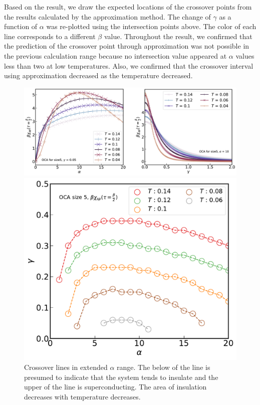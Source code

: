 \documentclass{article}[12pt]
\begin{document}
\begin{spacing}{1.3}
Based on the result, we draw the expected locations of the crossover points from the results calculated by the approximation method. 
The change of $\gamma$ as a function of $\alpha$ was re-plotted using the intersection points above. 
The color of each line corresponds to a different $\beta$ value.
Throughout the result, we confirmed that the prediction of the crossover point through approximation was not possible 
in the previous calculation range because no intersection value appeared at $\alpha$ values less than two at low temperatures. 
Also, we confirmed that the crossover interval using approximation decreased as the temperature decreased.
\pagebreak
\begin{figure}[H]
  \vfill
  \centerline{\includegraphics[width=13cm]{TexFigure/4/4_4_04_crossing.png}}
  \centerline{\includegraphics[width=13cm]{TexFigure/4/4_4_05_templine.pdf}}
  \caption{Crossover lines in extended $\alpha$ range. The below of the line is presumed to indicate that the system tends to insulate and the upper of the line is superconducting. The area of insulation decreases with temperature decreases.}

\end{figure}
\end{spacing}
\end{document}
